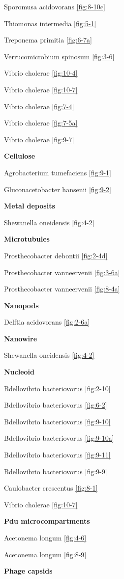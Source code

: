 \documentclass[]{tufte-book}
\begin{document}
Sporomusa acidovorans \ref{fig:8-10c}

Thiomonas intermedia \ref{fig:5-1}

Treponema primitia \ref{fig:6-7a}

Verrucomicrobium spinosum \ref{fig:3-6}

Vibrio cholerae \ref{fig:10-4}

Vibrio cholerae \ref{fig:10-7}

Vibrio cholerae \ref{fig:7-4}

Vibrio cholerae \ref{fig:7-5a}

Vibrio cholerae \ref{fig:9-7}

\textbf{Cellulose}

Agrobacterium tumefaciens \ref{fig:9-1}

Gluconacetobacter hansenii \ref{fig:9-2}

\textbf{Metal deposits}

Shewanella oneidensis \ref{fig:4-2}

\textbf{Microtubules}

Prosthecobacter debontii \ref{fig:2-4d}

Prosthecobacter vanneervenii \ref{fig:3-6a}

Prosthecobacter vanneervenii \ref{fig:8-4a}

\textbf{Nanopods}

Delftia acidovorans \ref{fig:2-6a}

\textbf{Nanowire}

Shewanella oneidensis \ref{fig:4-2}

\textbf{Nucleoid}

Bdellovibrio bacteriovorus \ref{fig:2-10}

Bdellovibrio bacteriovorus \ref{fig:6-2}

Bdellovibrio bacteriovorus \ref{fig:9-10}

Bdellovibrio bacteriovorus \ref{fig:9-10a}

Bdellovibrio bacteriovorus \ref{fig:9-11}

Bdellovibrio bacteriovorus \ref{fig:9-9}

Caulobacter crescentus \ref{fig:8-1}

Vibrio cholerae \ref{fig:10-7}

\textbf{Pdu microcompartments}

Acetonema longum \ref{fig:4-6}

Acetonema longum \ref{fig:8-9}

\textbf{Phage capsids}
\end{document}
